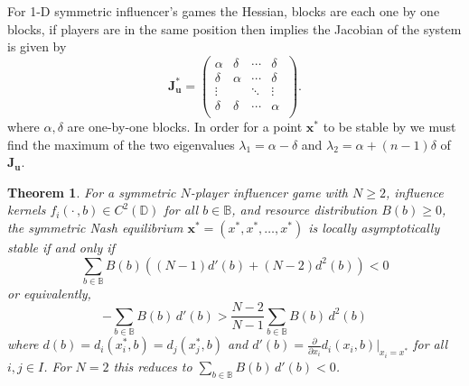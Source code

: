 \documentclass{article}
\newtheorem{theorem}{Theorem}[section]
\begin{document}
                 For 1-D  symmetric influencer's games the Hessian, blocks are each one by one blocks, if players are in the same position then  implies the Jacobian of the system is given by 
                \begin{equation}
                    \mathbf{J}_{\mathbf{u}}^*=\begin{pmatrix}
                    \alpha & \delta& \cdots & \delta\ \\ %
                    \delta & \alpha & \cdots & \delta\ \\ %
                    \vdots &  & \ddots &\vdots \\ %
                    \delta & \delta & \cdots & \alpha\ \\ %
                    \end{pmatrix}.
                \end{equation}
                where $\alpha,\delta$ are one-by-one blocks. In order for a point $\mathbf{x}^*$ to be stable by  we must find the maximum of the two eigenvalues $\lambda_1=\alpha-\delta$ and $\lambda_2=\alpha+(n-1)\delta$ of $\mathbf{J}_{\mathbf{u}}$. 
                \begin{theorem}\label{thm:SI_one-dimensional-stability}
                    For a symmetric $N$-player influencer game with $N \geq 2$, influence kernels $f_i(\cdot\,,b) \in C^2(\mathbb{D})$ for all $b \in \mathbb{B}$, and resource distribution $B(b) \geq 0$, the symmetric Nash equilibrium $\mathbf{x}^* = (x^*,x^*,\dots,x^*)$ is locally asymptotically stable if and only if\begin{equation}\label{eq:SS_threshold_1d_general}
                        \sum_{b\in\mathbb{B}} B(b)\left((N-1)d'(b) + (N-2)d^2(b)\right) < 0
                    \end{equation}
                    or equivalently,
                    \begin{equation}
                        -\sum_{b\in\mathbb{B}} B(b)\,d'(b) > \frac{N-2}{N-1}
                        \sum_{b\in\mathbb{B}} B(b)\,d^2(b)
                    \end{equation}
                    where $d(b) = d_i(x_i^*,b) = d_j(x_j^*,b)$ and $d'(b) = \frac{\partial}{\partial x_i}d_i(x_i,b)\big|_{x_i=x^*}$ for all $i,j \in I$. For $N=2$ this reduces to $\sum_{b\in\mathbb{B}}B(b)\,d'(b) < 0$.
                \end{theorem}
\end{document}
